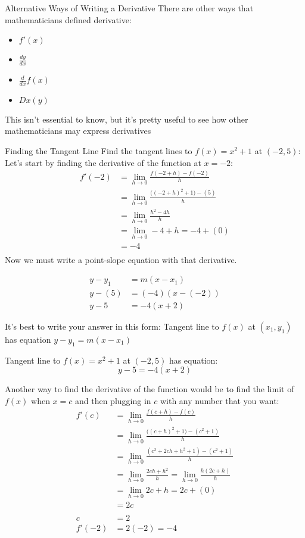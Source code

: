 \documentclass{MathNotes}
\begin{document}
\begin{note}{Alternative Ways of Writing a Derivative}
    There are other ways that mathematicians defined derivative:
    \begin{multicols}{2}[]
        \begin{itemize}
            \item $f'(x)$
            \item $\frac{dy}{dx}$
            \item $\frac{d}{dx}f(x)$
            \item $Dx(y)$
        \end{itemize}
    \end{multicols}
    This isn't essential to know, but it's pretty useful to see how other
    mathematicians may express derivatives
\end{note}
\begin{example}{Finding the Tangent Line}
    Find the tangent lines to $f(x)=x^2+1$ at $(-2, 5)$:
    \br
    Let's start by finding the derivative of the function at $x=-2$:
    \begin{align*}
        f'(-2)&=\lim_{h\to 0}\frac{f(-2+h)-f(-2)}{h} \\
        &=\lim_{h\to 0}\frac{\bigl((-2+h)^2+1\bigr)-(5)}{h} \\
        &=\lim_{h\to 0}\frac{h^2-4h}{h} \\
        &=\lim_{h\to 0}-4+h = -4 + (0)\\
        &=-4\\
    \end{align*}
    Now we must write a point-slope equation with that derivative. 

    \begin{align*}
        y-y_1&=m(x-x_1) \\
        y-(5)&=(-4)(x-(-2)) \\
        y-5&=-4(x+2)
    \end{align*}

    It's best to write your answer in this form: Tangent line to $f(x)$ at 
    $(x_1, y_1)$ has equation $y-y_1=m(x-x_1)$

    Tangent line to $f(x)=x^2+1$ at $(-2, 5)$ has equation: $$y-5=-4(x+2)$$
\end{example}

Another way to find the derivative of the function would be to find the limit
of $f(x)$ when $x=c$ and then plugging in $c$ with any number that you want:
\begin{align*}
    f'(c)&=\lim_{h\to 0}\frac{f(c+h)-f(c)}{h} \\
    &=\lim_{h\to 0}\frac{\bigl((c+h)^2+1\bigr)-(c^2+1)}{h} \\
    &=\lim_{h\to 0}\frac{(c^2+2ch+h^2+1)-(c^2+1)}{h} \\
    &=\lim_{h\to 0}\frac{2ch+h^2}{h} = \lim_{h\to 0}\frac{h(2c+h)}{h}\\
    &=\lim_{h\to 0} 2c+h=2c+(0)\\
    &=2c\\
    \\
    c&=2\\
    f'(-2)&=2(-2)=-4
\end{align*}
\end{document}
